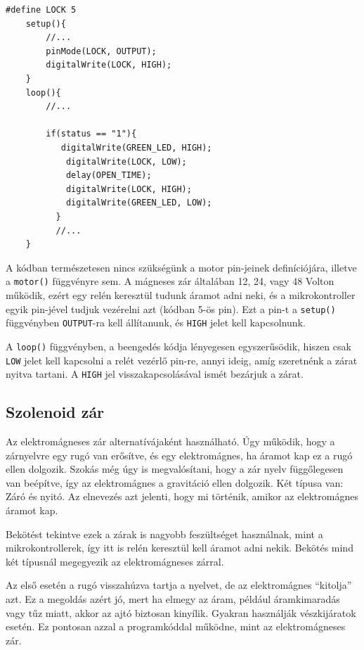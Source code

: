 \documentclass[
]{thesis-ekf}
\theoremstyle{definition}
\theoremstyle{remark}
\begin{document}
\begin{lstlisting}[caption=Elektromágneses zár vezérlő]
    #define LOCK 5
    setup(){
        //...
        pinMode(LOCK, OUTPUT);
        digitalWrite(LOCK, HIGH);
    }
    loop(){
        //...
        
        if(status == "1"){
           digitalWrite(GREEN_LED, HIGH);
            digitalWrite(LOCK, LOW);
            delay(OPEN_TIME);
            digitalWrite(LOCK, HIGH);
            digitalWrite(GREEN_LED, LOW);
          }
          //...
    }
\end{lstlisting}

A kódban természetesen nincs szükségünk a motor pin-jeinek definíciójára, illetve a \texttt{motor()} függvényre sem. A mágneses zár általában 12, 24, vagy 48 Volton működik, ezért egy relén keresztül tudunk áramot adni neki, és a mikrokontroller egyik pin-jével tudjuk vezérelni azt (kódban 5-ös pin). Ezt a pin-t a \texttt{setup()} függvényben \texttt{OUTPUT}-ra kell állítanunk, és \texttt{HIGH} jelet kell kapcsolnunk.

A \texttt{loop()} függvényben, a beengedés kódja lényegesen egyszerűsödik, hiszen csak \texttt{LOW} jelet kell kapcsolni a relét vezérlő pin-re, annyi ideig, amíg szeretnénk a zárat nyitva tartani. A \texttt{HIGH} jel visszakapcsolásával ismét bezárjuk a zárat.

\subsection*{Szolenoid zár}
Az elektromágneses zár alternatívájaként használható. Úgy működik, hogy a zárnyelvre egy rugó van erősítve, és egy elektromágnes, ha áramot kap ez a rugó ellen dolgozik. Szokás még úgy is megvalósítani, hogy a zár nyelv függőlegesen van beépítve, így az elektromágnes a gravitáció ellen dolgozik. Két típusa van: Záró és nyitó. Az elnevezés azt jelenti, hogy mi történik, amikor az elektromágnes áramot kap. \cite{solenoid}

Bekötést tekintve ezek a zárak is nagyobb feszültséget használnak, mint a mikrokontrollerek, így itt is relén keresztül kell áramot adni nekik. Bekötés mind két típusnál megegyezik az elektromágneses zárral.

Az első esetén a rugó visszahúzva tartja a nyelvet, de az elektromágnes \enquote{kitolja} azt. Ez a megoldás azért jó, mert ha elmegy az áram, például áramkimaradás vagy tűz miatt, akkor az ajtó biztosan kinyílik. Gyakran használják vészkijáratok esetén. \cite{solenoid-types} Ez pontosan azzal a programkóddal működne, mint az elektromágneses zár.
\end{document}
